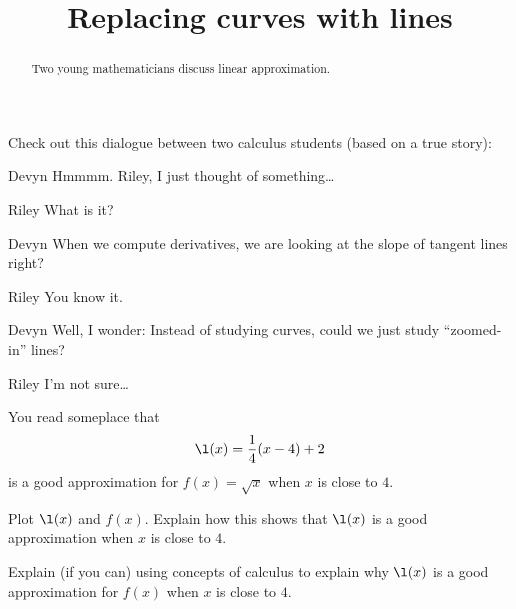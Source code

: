 \documentclass{ximera}
\title[Break-Ground:]{Replacing curves with lines}
\begin{document}
\begin{abstract}
Two young mathematicians discuss linear approximation.
\end{abstract}
\maketitle

Check out this dialogue between two calculus students (based on a true
story):



\begin{dialogue}
\item[Devyn] Hmmmm. Riley, I just thought of something\dots
\item[Riley] What is it?
\item[Devyn] When we compute derivatives, we are looking at the slope
  of tangent lines right?
\item[Riley] You know it.
\item[Devyn] Well, I wonder: Instead of studying curves, could we just
  study ``zoomed-in'' lines?
\item[Riley] I'm not sure\dots
\end{dialogue}


You read someplace that
\[
\l(x) = \frac{1}{4}(x-4)+2
\]
is a good approximation for $f(x) = \sqrt{x}$ when $x$ is close to
$4$.

\begin{problem}
  Plot $\l(x)$ and $f(x)$. Explain how this shows that $\l(x)$ is a
  good approximation when $x$ is close to $4$.
  \begin{prompt}
  \begin{freeResponse}
  \end{freeResponse}
  \end{prompt}
\end{problem}

\begin{problem}
 Explain (if you can) using concepts of calculus to explain why
 $\l(x)$ is a good approximation for $f(x)$ when $x$ is close to $4$.
 \begin{prompt}
  \begin{freeResponse}
  \end{freeResponse}
 \end{prompt}
\end{problem}




%
\end{document}
